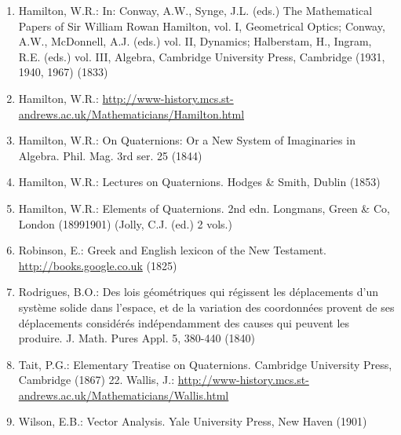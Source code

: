 \begin{enumerate}
  \item Hamilton, W.R.: In: Conway, A.W., Synge, J.L. (eds.) The Mathematical Papers of Sir William Rowan Hamilton, vol. I, Geometrical Optics; Conway, A.W., McDonnell, A.J. (eds.) vol. II, Dynamics; Halberstam, H., Ingram, R.E. (eds.) vol. III, Algebra, Cambridge University Press, Cambridge (1931, 1940, 1967) (1833)

  \item Hamilton, W.R.: \href{http://www-history.mcs.st-andrews.ac.uk/Mathematicians/Hamilton.html}{http://www-history.mcs.st-andrews.ac.uk/Mathematicians/Hamilton.html}

  \item Hamilton, W.R.: On Quaternions: Or a New System of Imaginaries in Algebra. Phil. Mag. 3rd ser. 25 (1844)

  \item Hamilton, W.R.: Lectures on Quaternions. Hodges \& Smith, Dublin (1853)

  \item Hamilton, W.R.: Elements of Quaternions. 2nd edn. Longmans, Green \& Co, London (18991901) (Jolly, C.J. (ed.) 2 vols.)

  \item Robinson, E.: Greek and English lexicon of the New Testament. \href{http://books.google.co.uk}{http://books.google.co.uk} (1825)

  \item Rodrigues, B.O.: Des lois géométriques qui régissent les déplacements d'un système solide dans l'espace, et de la variation des coordonnées provent de ses déplacements considérés indépendamment des causes qui peuvent les produire. J. Math. Pures Appl. 5, 380-440 (1840)

  \item Tait, P.G.: Elementary Treatise on Quaternions. Cambridge University Press, Cambridge (1867) 22. Wallis, J.: \href{http://www-history.mcs.st-andrews.ac.uk/Mathematicians/Wallis.html}{http://www-history.mcs.st-andrews.ac.uk/Mathematicians/Wallis.html}

  \item Wilson, E.B.: Vector Analysis. Yale University Press, New Haven (1901)

\end{enumerate}

